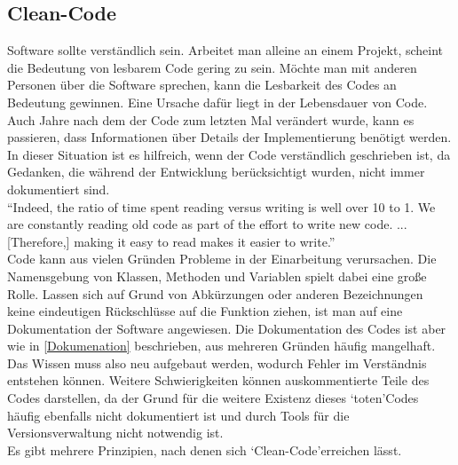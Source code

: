 \subsection{Clean-Code}
\label{CC}
Software sollte verständlich sein. Arbeitet man alleine an einem Projekt, scheint die Bedeutung von lesbarem Code gering zu sein. Möchte man mit anderen Personen über die Software sprechen, kann die Lesbarkeit des Codes an Bedeutung gewinnen. Eine Ursache dafür liegt in der Lebensdauer von Code. Auch Jahre nach dem der Code zum letzten Mal verändert wurde, kann es passieren, dass Informationen über Details der Implementierung benötigt werden. In dieser Situation ist es hilfreich, wenn der Code verständlich geschrieben ist, da Gedanken, die während der Entwicklung berücksichtigt wurden, nicht immer dokumentiert sind\cite{https://doi.org/10.1111/2041-210X.13961}.\\ “Indeed, the ratio of time spent reading versus writing is well over 10 to 1. We are constantly reading old code as part of the effort to write new code. ...[Therefore,] making it easy to read makes it easier to write.”\cite{hutton2009clean}\\
Code kann aus vielen Gründen Probleme in der Einarbeitung verursachen. Die Namensgebung von Klassen, Methoden und Variablen spielt dabei eine große Rolle. Lassen sich auf Grund von Abkürzungen oder anderen Bezeichnungen keine eindeutigen Rückschlüsse auf die Funktion ziehen, ist man auf eine Dokumentation der Software angewiesen. Die Dokumentation des Codes ist aber wie in \ref{Dokumenation} beschrieben, aus mehreren Gründen häufig mangelhaft. Das Wissen muss also neu aufgebaut werden, wodurch Fehler im Verständnis entstehen können. Weitere Schwierigkeiten können auskommentierte Teile des Codes darstellen, da der Grund für die weitere Existenz dieses \lq toten\rq\space Codes häufig ebenfalls nicht dokumentiert ist und durch Tools für die Versionsverwaltung nicht notwendig ist. \\
Es gibt mehrere Prinzipien, nach denen sich \lq Clean-Code\rq\space erreichen lässt.\\
